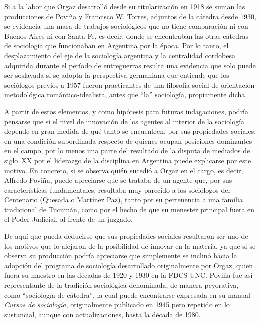 Si a la labor que Orgaz desarrolló desde su titularización en 1918 se suman las producciones de Poviña y Francisco W. Torres, adjuntos de la cátedra desde 1930, se evidencia una masa de trabajos sociológicos que no tiene comparación ni con Buenos Aires ni con Santa Fe, es decir, donde se encontraban las otras cátedras de sociología que funcionaban en Argentina por la época. Por lo tanto, el desplazamiento del eje de la sociología argentina y la centralidad cordobesa adquirida durante el período de entreguerras resulta una evidencia que solo puede ser soslayada si se adopta la perspectiva germaniana que entiende que los sociólogos previos a 1957 fueron practicantes de una filosofía social de orientación metodológica romántico-idealista, antes que \enquote{la} sociología, propiamente dicha.

A partir de estos elementos, y como hipótesis para futuras indagaciones, podría pensarse que si el nivel de innovación de los agentes al interior de la sociología depende en gran medida de qué tanto se encuentren, por sus propiedades sociales, en una condición subordinada respecto de quienes ocupan posiciones dominantes en el campo, por lo menos una parte del resultado de la disputa de mediados de siglo~XX por el liderazgo de la disciplina en Argentina puede explicarse por este motivo. En concreto, si se observa quién sucedió a Orgaz en el cargo, es decir, Alfredo Poviña, puede apreciarse que se trataba de un agente que, por sus características fundamentales, resultaba muy parecido a los sociólogos del Centenario (Quesada o Martínez Paz), tanto por su pertenencia a una familia tradicional de Tucumán, como por el hecho de que su menester principal fuera en el Poder Judicial, al frente de un juzgado.

De aquí que pueda deducirse que sus propiedades sociales resultaron ser uno de los motivos que lo alejaron de la posibilidad de innovar en la materia, ya que si se observa su producción podría apreciarse que simplemente se inclinó hacia la adopción del programa de sociología desarrollado originalmente por Orgaz, quien fuera su maestro en las décadas de 1920 y 1930 en la FDCS-UNC. Poviña fue así representante de la tradición sociológica denominada, de manera peyorativa, como \enquote{sociología de cátedra}, la cual puede encontrarse expresada en su manual \emph{Cursos de sociología}, originalmente publicado en 1945 pero repetido en lo sustancial, aunque con actualizaciones, hasta la década de 1980.

